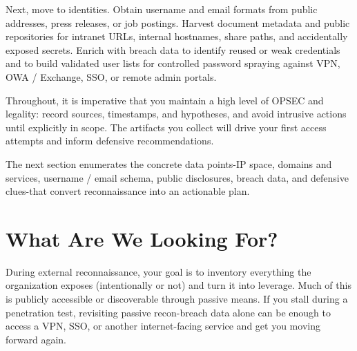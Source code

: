 Next, move to identities. Obtain username and email formats from public addresses, press releases, or job postings. Harvest document metadata and public repositories for intranet URLs, internal hostnames, share paths, and accidentally exposed secrets. Enrich with breach data to identify reused or weak credentials and to build validated user lists for controlled password spraying against VPN, OWA / Exchange, SSO, or remote admin portals.

Throughout, it is imperative that you maintain a high level of OPSEC and legality: record sources, timestamps, and hypotheses, and avoid intrusive actions until explicitly in scope. The artifacts you collect will drive your first access attempts and inform defensive recommendations.

The next section enumerates the concrete data points-IP space, domains and services, username / email schema, public disclosures, breach data, and defensive clues-that convert reconnaissance into an actionable plan.

\section{What Are We Looking For?}
During external reconnaissance, your goal is to inventory everything the organization exposes (intentionally or not) and turn it into leverage. Much of this is publicly accessible or discoverable through passive means. If you stall during a penetration test, revisiting passive recon-breach data alone can be enough to access a VPN, SSO, or another internet-facing service and get you moving forward again.

